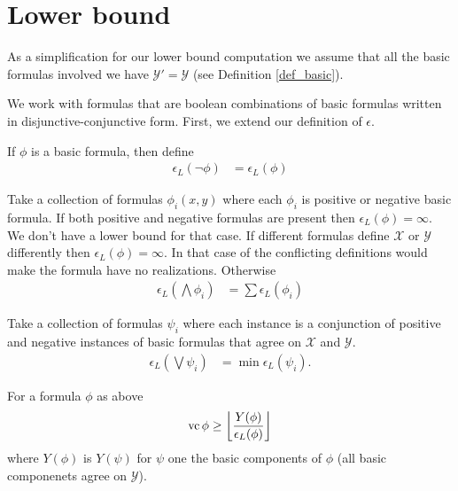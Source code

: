 \documentclass{amsart}
\newcommand{\X}{\mathcal X}
\newcommand{\Y}{\mathcal Y}
\providecommand{\floor}[1]{\left \lfloor #1 \right \rfloor }
\begin{document}
\section{Lower bound}

As a simplification for our lower bound computation we assume that all the basic formulas involved we have $\Y' = \Y$ (see Definition \ref{def_basic}).

We work with formulas that are boolean combinations of basic formulas written in disjunctive-conjunctive form.
First, we extend our definition of $\epsilon$.

\begin{Definition}[Negation]
  If $\phi$ is a basic formula, then define
  \begin{align*}
    \epsilon_L(\neg \phi) &= \epsilon_L(\phi)
  \end{align*}
\end{Definition}

\begin{Definition}[Conjunction]
  Take a collection of formulas $\phi_i(x, y)$ where each $\phi_i$ is positive or negative basic formula.
  If both positive and negative formulas are present then $\epsilon_L(\phi) = \infty$.
  We don't have a lower bound for that case.
  If different formulas define $\X$ or $\Y$ differently then $\epsilon_L(\phi) = \infty$.
  In that case of the conflicting definitions would make the formula have no realizations.
  Otherwise
  \begin{align*}
    \epsilon_L(\bigwedge \phi_i) &= \sum \epsilon_L(\phi_i)
  \end{align*}
\end{Definition}

\begin{Definition} [Disjunction]
  Take a collection of formulas $\psi_i$ where each instance is a conjunction of positive and negative instances of basic formulas that agree on $\X$ and $\Y$. %
  \begin{align*}
    \epsilon_L(\bigvee \psi_i) &= \min \epsilon_L(\psi_i).
  \end{align*}
\end{Definition}

\begin{Theorem}
  For a formula $\phi$ as above
  \begin{align*}
    \vc \phi \geq \floor{\frac{Y(\phi)}{\epsilon_L(\phi)}}
  \end{align*}
  where $Y(\phi)$ is $Y(\psi)$ for $\psi$ one the basic components of $\phi$ (all basic componenets agree on $\Y$).
\end{Theorem}
\end{document}
